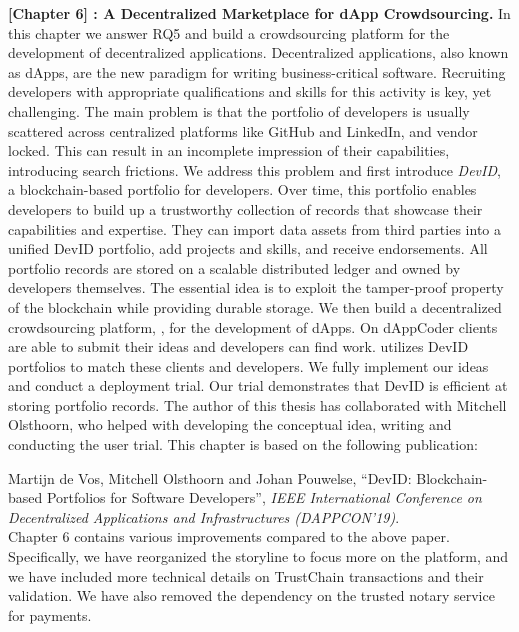 \textbf{[Chapter 6] \Dappcoder{}: A Decentralized Marketplace for dApp Crowdsourcing.}
In this chapter we answer RQ5 and build a crowdsourcing platform for the development of decentralized applications.
Decentralized applications, also known as dApps, are the new paradigm for writing business-critical software.
Recruiting developers with appropriate qualifications and skills for this activity is key, yet challenging.
The main problem is that the portfolio of developers is usually scattered across centralized platforms like GitHub and LinkedIn, and vendor locked.
This can result in an incomplete impression of their capabilities, introducing search frictions.
We address this problem and first introduce \emph{DevID}, a blockchain-based portfolio for developers.
Over time, this portfolio enables developers to build up a trustworthy collection of records that showcase their capabilities and expertise.
They can import data assets from third parties into a unified DevID portfolio, add projects and skills, and receive endorsements.
All portfolio records are stored on a scalable distributed ledger and owned by developers themselves.
The essential idea is to exploit the tamper-proof property of the blockchain while providing durable storage.
We then build a decentralized crowdsourcing platform, \emph{\Dappcoder{}}, for the development of dApps.
On dAppCoder clients are able to submit their ideas and developers can find work.
\Dappcoder{} utilizes DevID portfolios to match these clients and developers.
We fully implement our ideas and conduct a deployment trial.
Our trial demonstrates that DevID is efficient at storing portfolio records.
The author of this thesis has collaborated with Mitchell Olsthoorn, who helped with developing the conceptual idea, writing and conducting the user trial.
This chapter is based on the following publication:

Martijn de Vos, Mitchell Olsthoorn and Johan Pouwelse, \enquote{DevID: Blockchain-based Portfolios for Software Developers}, \emph{IEEE International Conference on Decentralized Applications and Infrastructures (DAPPCON'19)}.\\

Chapter 6 contains various improvements compared to the above paper.
Specifically, we have reorganized the storyline to focus more on the \Dappcoder{} platform, and we have included more technical details on TrustChain transactions and their validation.
We have also removed the dependency on the trusted notary service for payments.\\

